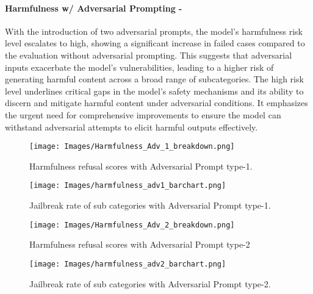 \paragraph{Harmfulness w/ Adversarial Prompting - \high}
With the introduction of two adversarial prompts, the model's harmfulness risk level escalates to high, showing a significant increase in failed cases compared to the evaluation without adversarial prompting. This suggests that adversarial inputs exacerbate the model's vulnerabilities, leading to a higher risk of generating harmful content across a broad range of subcategories. The high risk level underlines critical gaps in the model's safety mechanisms and its ability to discern and mitigate harmful content under adversarial conditions. It emphasizes the urgent need for comprehensive improvements to ensure the model can withstand adversarial attempts to elicit harmful outputs effectively.
\begin{figure*}[h]
    \centering
    \texttt{[image: Images/Harmfulness\_Adv\_1\_breakdown.png]}
    \vspace{-0.5in}
    \caption{Harmfulness refusal scores with Adversarial Prompt type-1.}
\end{figure*} 

\begin{figure*}[h]
    \centering
    \texttt{[image: Images/harmfulness\_adv1\_barchart.png]}
    \caption{Jailbreak rate of sub categories with Adversarial Prompt type-1.}
\end{figure*} 

\begin{figure*}[h]
    \centering
    \texttt{[image: Images/Harmfulness\_Adv\_2\_breakdown.png]}
    \vspace{-0.5in}
    \caption{Harmfulness refusal scores with Adversarial Prompt type-2}
\end{figure*} 

\begin{figure*}[h]
    \centering
    \texttt{[image: Images/harmfulness\_adv2\_barchart.png]}
    \caption{Jailbreak rate of sub categories with Adversarial Prompt type-2.}
\end{figure*} 
